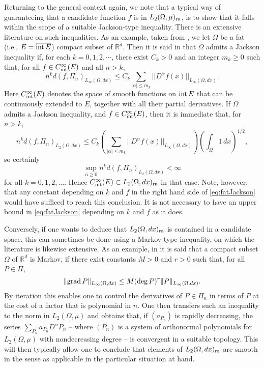 \documentclass[12pt, reqno]{amsart}
\numberwithin{equation}{section}
\theoremstyle{plain}
\theoremstyle{definition}
\begin{document}
Returning to the general context again, we note that a typical way of guaranteeing that a candidate function $f$ is in $L_2(\Omega,\mu)_{\textup{ra}}$, is to show that it falls within the scope of a suitable Jackson-type inequality. There is an extensive literature on such inequalities. As an example, taken from \cite[p.~815]{Ple}, we let $\Omega$ be a fat (i.e., $E=\overline{\textup{int}\, E}$) compact subset of ${{\mathbb R}}^d$. Then it is said in \cite{Ple} that $\Omega$ admits a Jackson inequality if, for each $k=0,1,2,\cdots$, there exist $C_k>0$ and an integer $m_{k}\geq 0$ such that, for all $f\in C_{\textup{int}}^{\infty}(E)$ and all $n>k$,
\begin{equation}\label{eq:fatJackson}
n^{k}d(f,\Pi_n)_{L_\infty(\Omega,dx)}\leq C_{k}\sum_{|\alpha|\leq m_{k}}|| D^{\alpha}f(x)||_{L_\infty(\Omega,dx)}.
\end{equation}
Here $C_{\textup{int}}^{\infty}(E)$ denotes the space of smooth functions on $\textup{int}\, E$ that can be continuously extended to $E$, together with all their partial derivatives. If $\Omega$ admits a Jackson inequality, and $f\in C_{\textup{int}}^\infty(E)$, then it is immediate that, for $n>k$,
\begin{equation*}
n^{k}d(f,\Pi_n)_{L_2(\Omega,dx)}\leq C_{k}\left(\sum_{|\alpha|\leq m_{k}}|| D^{\alpha}f(x)||_{L_\infty(\Omega,dx)}\right)\left(\int_\Omega 1\,dx\right)^{1/2},
\end{equation*}
so certainly
\begin{equation*}
\sup_{n\geq 0} n^{k}d(f,\Pi_n)_{L_2(\Omega,dx)} < \infty
\end{equation*}
for all $k=0,1,2,\ldots$. Hence $C_{\textup{int}}^{\infty}(E)\subset L_2(\Omega,dx)_{\textup{ra}}$ in that case. Note, however, that any constant depending on $k$ and $f$ in the right hand side of \eqref{eq:fatJackson} would have sufficed to reach this conclusion. It is not necessary to have an upper bound in \eqref{eq:fatJackson} depending on $k$ and $f$ as it does.

Conversely, if one wants to deduce that $L_2(\Omega,dx)_{\textup{ra}}$ is contained in a candidate space, this can sometimes be done using a Markov-type inequality, on which the literature is likewise extensive. As an example, in \cite[p.~450]{Ples} it is said that a compact subset $\Omega$ of ${{\mathbb R}}^d$ is Markov, if there exist constants $M>0$ and $r>0$ such that, for all $P\in\Pi$,
\begin{equation*}
\|\textup{grad}\,P\|_{L_\infty(\Omega,dx)}\leq M (\textup{deg}\,P)^r \| P \|_{L_\infty(\Omega,dx)}.
\end{equation*}
By iteration this enables one to control the derivatives of $P\in\Pi_n$ in terms of $P$ at the cost of a factor that is polynomial in $n$. One then transfers such an inequality to the norm in $L_2(\Omega,\mu)$ and obtains that, if ${({a_{P_n}})}$ is rapidly decreasing, the series $\sum_{P_n} a_{P_n} D^\alpha P_n$ -- where ${({P_n})}$ is a system of orthonormal polynomials for $L_2(\Omega,\mu)$ with nondecreasing degree -- is convergent in a suitable topology. This will then typically allow one to conclude that elements of $L_2(\Omega,dx)_{\textup{ra}}$ are smooth in the sense as applicable in the particular situation at hand.
\end{document}
